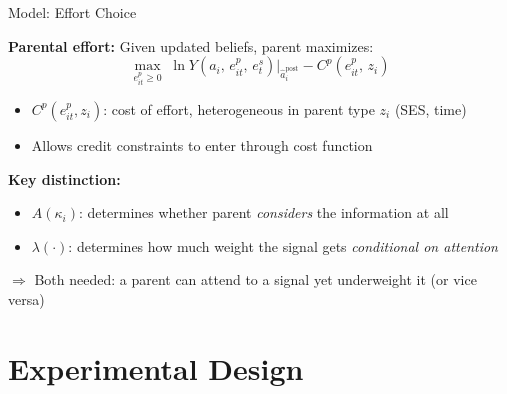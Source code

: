 \documentclass[aspectratio=169,11pt]{beamer}
\begin{document}
\begin{frame}{Model: Effort Choice}

\textbf{Parental effort:} Given updated beliefs, parent maximizes:
\[
\max_{e_{it}^p \geq 0} \; \ln Y\!\left(a_i,\, e_{it}^p,\, e_{t}^s\right)\Big|_{\hat{a}_{i}^{\text{post}}} - C^p(e_{it}^p,\, z_i)
\]

\begin{itemize}
    \item $C^p(e_{it}^p, z_i)$: cost of effort, heterogeneous in parent type $z_i$ (SES, time)
    \item Allows credit constraints to enter through cost function
\end{itemize}

\bigskip

\textbf{Key distinction:}
\begin{itemize}
    \item $A(\kappa_i)$: determines whether parent \emph{considers} the information at all
    \item $\lambda(\cdot)$: determines how much weight the signal gets \emph{conditional on attention}
\end{itemize}

\bigskip

$\Rightarrow$ Both needed: a parent can attend to a signal yet underweight it (or vice versa)

\end{frame}

\section{Experimental Design}
\end{document}
